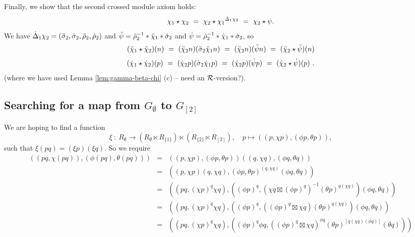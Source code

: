 \begin{pf}
Finally, we show that the second crossed module axiom holds:
$$ 
\chi_1 \star \chi_2 ~=~ \chi_2 \star {\chi_1}^{\dot{\Delta}_1 \chi_2} 
                    ~=~ \chi_2 \star \psi.
$$
We have $\dot{\Delta}_1 \chi_2 = (\ddot{\sigma}_2, \dot{\sigma}_2, \ddot{\rho}_2, \dot{\rho}_2)$ and  
$\ddot{\psi} = \ddot{\rho}_2^{-1} * \ddot{\chi}_1 * \ddot{\sigma}_2$ and 
$\dot{\psi} = \dot{\rho}_2^{-1} * \dot{\chi}_1 * \dot{\sigma}_2$,
so
$$
(\ddot{\chi}_1 \star \ddot{\chi}_2)(n) 
  ~=~ (\ddot{\chi}_2 n)(\ddot{\sigma}_2 \ddot{\chi}_1 n) \\
  ~=~ (\ddot{\chi}_2 n) (\ddot{\psi} n) \\
  ~=~ (\ddot{\chi}_2 \star \ddot{\psi})(n) \\
$$
$$
(\dot{\chi}_1 \star \dot{\chi}_2)(p) 
  ~=~ (\dot{\chi}_2 p)(\dot{\sigma}_2 \dot{\chi}_1 p) \\
  ~=~ (\dot{\chi}_2 p) (\dot{\psi} p) \\
  ~=~ (\dot{\chi}_2 \star \dot{\psi})(p)~.
$$
(where we have used Lemma \ref{lem:gamma-beta-chi} (c)  
 -- need an $\mathcal{R}$-version?).
\end{pf}


\subsection{Searching for a map from $G_{\emptyset}$ to $G_{[2]}$}
\label{subs:search}

We are hoping to find a function
$$
\xi ~:~ R_{\emptyset} \to (R_{\emptyset} \ltimes R_{\{1\}})
                 \ltimes (R_{\{2\}} \ltimes R_{[2]}),
\quad
p \mapsto ((p, \chi p), (\phi p, \theta p)),
$$
such that $\xi(pq) = (\xi p)(\xi q)$.
So we require
\begin{eqnarray*}
((pq, \chi(pq)), (\phi(pq), \theta(pq)))
  & = & ((p, \chi p),(\phi p, \theta p))((q, \chi q),(\phi q, \theta q)) \\
  & = & ((p, \chi p)(q, \chi q),
         (\phi p, \theta p)^{(q, \chi q)}(\phi q,\theta q)) \\
  & = & ((pq, (\chi p)^q \chi q),
         ((\phi p)^q, (\chi q \boxtimes (\phi p)^q)^{-1} 
                      (\theta p)^{q (\chi q)}) (\phi q, \theta q)) \\
  & = & ((pq, (\chi p)^q \chi q),
         ((\phi p)^q, ((\phi p)^q \boxtimes \chi q) 
                      (\theta p)^{q (\chi q)}) (\phi q, \theta q)) \\
  & = & ((pq, (\chi p)^q \chi q),
         ((\phi p)^q \phi q, ((\phi p)^q \boxtimes \chi q)^{\phi q} 
                      (\theta p)^{[q (\chi q)(\phi q)]} (\theta q))) \\
\end{eqnarray*}

